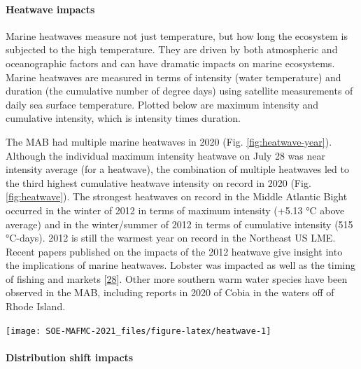\documentclass[
  10pt,
]{article}
\let\origfigure\figure
\let\endorigfigure\endfigure
\renewenvironment{figure}[1][2] {
    \expandafter\origfigure\expandafter[H]
} {
    \endorigfigure
}
\begin{document}
\hypertarget{heatwave-impacts}{%
\paragraph{Heatwave impacts}\label{heatwave-impacts}}

Marine heatwaves measure not just temperature, but how long the
ecosystem is subjected to the high temperature. They are driven by both
atmospheric and oceanographic factors and can have dramatic impacts on
marine ecosystems. Marine heatwaves are measured in terms of intensity
(water temperature) and duration (the cumulative number of degree days)
using satellite measurements of daily sea surface temperature. Plotted
below are maximum intensity and cumulative intensity, which is intensity
times duration.

The MAB had multiple marine heatwaves in 2020 (Fig.
\ref{fig:heatwave-year}). Although the individual maximum intensity
heatwave on July 28 was near intensity average (for a heatwave), the
combination of multiple heatwaves led to the third highest cumulative
heatwave intensity on record in 2020 (Fig. \ref{fig:heatwave}). The
strongest heatwaves on record in the Middle Atlantic Bight occurred in
the winter of 2012 in terms of maximum intensity (+5.13 °C above
average) and in the winter/summer of 2012 in terms of cumulative
intensity (515 °C-days). 2012 is still the warmest year on record in the
Northeast US LME. Recent papers published on the impacts of the 2012
heatwave give insight into the implications of marine heatwaves. Lobster
was impacted as well as the timing of fishing and markets
{[}\protect\hyperlink{ref-mills_fisheries_2013}{28}{]}. Other more
southern warm water species have been observed in the MAB, including
reports in 2020 of Cobia in the waters off of Rhode Island.

\begin{figure}

{\centering \texttt{[image: SOE-MAFMC-2021\_files/figure-latex/heatwave-1]} 

}

\caption{Marine heatwave cumulative intesity (left) and maximum intensity (right) in the Mid-Atlantic Bight.}\label{fig:heatwave}
\end{figure}

\hypertarget{distribution-shift-impacts}{%
\paragraph{Distribution shift
impacts}\label{distribution-shift-impacts}}
\end{document}
